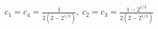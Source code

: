 \documentclass[preview]{standalone}
\begin{document}
\begin{align*}
c_1=c_4=\frac{1}{2(2-2^{1/3})},\ c_2=c_3=\frac{1-2^{1/3}}{2(2-2^{1/3})}
\end{align*}
\end{document}
